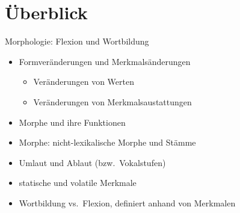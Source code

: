 \section{Überblick}

\begin{frame}
  {Morphologie: Flexion und Wortbildung}
  \pause
  \begin{itemize}[<+->]
    \item \alert{Formveränderungen} und \alert{Merkmalsänderungen}
      \begin{itemize}[<+->]
        \item Veränderungen von Werten
        \item Veränderungen von Merkmalsaustattungen
      \end{itemize}
      \Halbzeile
    \item Morphe und ihre Funktionen
    \item Morphe: nicht-lexikalische Morphe und Stämme
    \item Umlaut und Ablaut (bzw.\ Vokalstufen)
    \item statische und volatile Merkmale
    \item Wortbildung vs.\ Flexion, definiert anhand von Merkmalen
  \end{itemize}
\end{frame}

